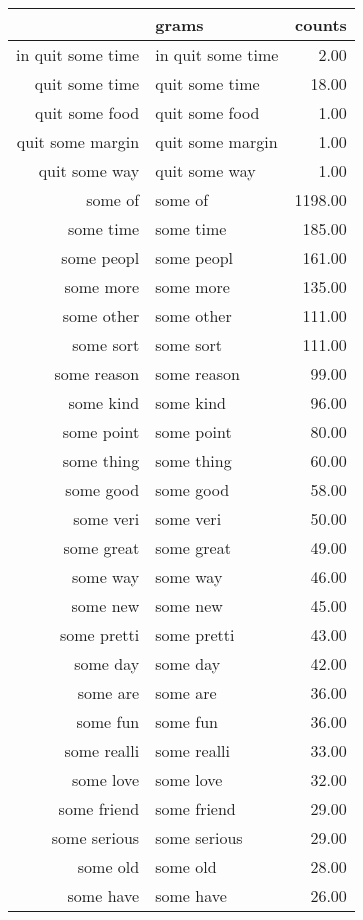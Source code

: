 \begin{table}[ht]
\centering
\begin{tabular}{rlr}
  \hline
 & grams & counts \\ 
  \hline
in quit some time & in quit some time & 2.00 \\ 
  quit some time & quit some time & 18.00 \\ 
  quit some food & quit some food & 1.00 \\ 
  quit some margin & quit some margin & 1.00 \\ 
  quit some way & quit some way & 1.00 \\ 
  some of & some of & 1198.00 \\ 
  some time & some time & 185.00 \\ 
  some peopl & some peopl & 161.00 \\ 
  some more & some more & 135.00 \\ 
  some other & some other & 111.00 \\ 
  some sort & some sort & 111.00 \\ 
  some reason & some reason & 99.00 \\ 
  some kind & some kind & 96.00 \\ 
  some point & some point & 80.00 \\ 
  some thing & some thing & 60.00 \\ 
  some good & some good & 58.00 \\ 
  some veri & some veri & 50.00 \\ 
  some great & some great & 49.00 \\ 
  some way & some way & 46.00 \\ 
  some new & some new & 45.00 \\ 
  some pretti & some pretti & 43.00 \\ 
  some day & some day & 42.00 \\ 
  some are & some are & 36.00 \\ 
  some fun & some fun & 36.00 \\ 
  some realli & some realli & 33.00 \\ 
  some love & some love & 32.00 \\ 
  some friend & some friend & 29.00 \\ 
  some serious & some serious & 29.00 \\ 
  some old & some old & 28.00 \\ 
  some have & some have & 26.00 \\ 

\end{tabular}
\end{table}

